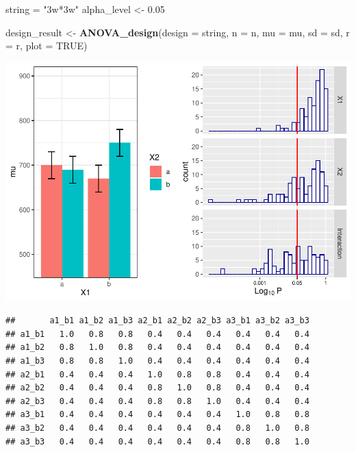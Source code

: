 \documentclass[
]{book}
\newenvironment{Shaded}{\begin{snugshade}}{\end{snugshade}}
\newcommand{\DataTypeTok}[1]{\textcolor[rgb]{0.13,0.29,0.53}{#1}}
\newcommand{\FloatTok}[1]{\textcolor[rgb]{0.00,0.00,0.81}{#1}}
\newcommand{\KeywordTok}[1]{\textcolor[rgb]{0.13,0.29,0.53}{\textbf{#1}}}
\newcommand{\NormalTok}[1]{#1}
\newcommand{\OperatorTok}[1]{\textcolor[rgb]{0.81,0.36,0.00}{\textbf{#1}}}
\newcommand{\OtherTok}[1]{\textcolor[rgb]{0.56,0.35,0.01}{#1}}
\newcommand{\StringTok}[1]{\textcolor[rgb]{0.31,0.60,0.02}{#1}}
\begin{document}
\begin{Shaded}
\begin{Highlighting}[]
\NormalTok{string =}\StringTok{ "3w*3w"}
\NormalTok{alpha_level <-}\StringTok{ }\FloatTok{0.05}

\NormalTok{design_result <-}\StringTok{ }\KeywordTok{ANOVA_design}\NormalTok{(}\DataTypeTok{design =}\NormalTok{ string,}
                              \DataTypeTok{n =}\NormalTok{ n, }
                              \DataTypeTok{mu =}\NormalTok{ mu, }
                              \DataTypeTok{sd =}\NormalTok{ sd, }
                              \DataTypeTok{r =}\NormalTok{ r, }
                              \DataTypeTok{plot =} \OtherTok{TRUE}\NormalTok{)}
\end{Highlighting}
\end{Shaded}

\includegraphics{SuperpowerValidation_files/figure-latex/unnamed-chunk-118-1.pdf}

\begin{Shaded}
\end{Shaded}

\begin{verbatim}
##       a1_b1 a1_b2 a1_b3 a2_b1 a2_b2 a2_b3 a3_b1 a3_b2 a3_b3
## a1_b1   1.0   0.8   0.8   0.4   0.4   0.4   0.4   0.4   0.4
## a1_b2   0.8   1.0   0.8   0.4   0.4   0.4   0.4   0.4   0.4
## a1_b3   0.8   0.8   1.0   0.4   0.4   0.4   0.4   0.4   0.4
## a2_b1   0.4   0.4   0.4   1.0   0.8   0.8   0.4   0.4   0.4
## a2_b2   0.4   0.4   0.4   0.8   1.0   0.8   0.4   0.4   0.4
## a2_b3   0.4   0.4   0.4   0.8   0.8   1.0   0.4   0.4   0.4
## a3_b1   0.4   0.4   0.4   0.4   0.4   0.4   1.0   0.8   0.8
## a3_b2   0.4   0.4   0.4   0.4   0.4   0.4   0.8   1.0   0.8
## a3_b3   0.4   0.4   0.4   0.4   0.4   0.4   0.8   0.8   1.0
\end{verbatim}
\end{document}
